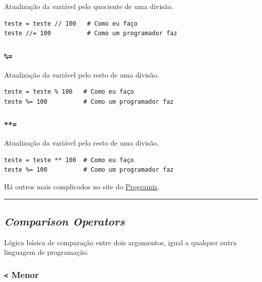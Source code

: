 \documentclass[]{book}
\begin{document}
Atualização da variável pelo quociente de uma divisão.

\begin{verbatim}
teste = teste // 100   # Como eu faço
teste //= 100          # Como um programador faz
\end{verbatim}

\subsubsection{\texorpdfstring{\texttt{\%=}}{\%=}}\label{section-5}

Atualização da variável pelo resto de uma divisão.

\begin{verbatim}
teste = teste % 100   # Como eu faço
teste %= 100          # Como um programador faz
\end{verbatim}

\subsubsection{\texorpdfstring{\texttt{**=}}{**=}}\label{section-6}

Atualização da variável pelo resto de uma divisão.

\begin{verbatim}
teste = teste ** 100  # Como eu faço
teste %= 100          # Como um programador faz
\end{verbatim}

Há outros mais complicados no site do
\href{https://www.programiz.com/python-programming/operators}{Programiz}.

\begin{center}\rule{0.5\linewidth}{\linethickness}\end{center}

\subsection{\texorpdfstring{\emph{Comparison
Operators}}{Comparison Operators}}\label{comparison-operators}

Lógica básica de comparação entre dois argumentos, igual a qualquer
outra linguagem de programação.

\subsubsection{\texorpdfstring{\texttt{\textless{}}
Menor}{\textless{} Menor}}\label{menor}
\end{document}
